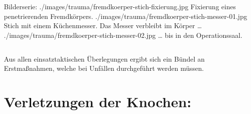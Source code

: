 \begin{PictureSeriesWide}{}{Bilderserie: }
{./images/trauma/fremdkoerper-stich-fixierung.jpg}
{Fixierung
eines penetrierenden Fremdkörpers. }
{./images/trauma/fremdkoerper-stich-messer-01.jpg}
{Stich mit einem Küchenmesser. 
Das Messer verbleibt im Körper {\ldots}~
}
{./images/trauma/fremdkoerper-stich-messer-02.jpg}
{{\ldots} bis in den Operationssaal.
}
{}
{}
\end{PictureSeriesWide}


\subsection{}
Aus allen einsatztaktischen Überlegungen ergibt sich ein
Bündel an Erstmaßnahmen, welche bei Unfällen durchgeführt
werden müssen.





\clearpage %
\section{Verletzungen der Knochen: }

\label{topic:frakturen}%

\subsection{}

